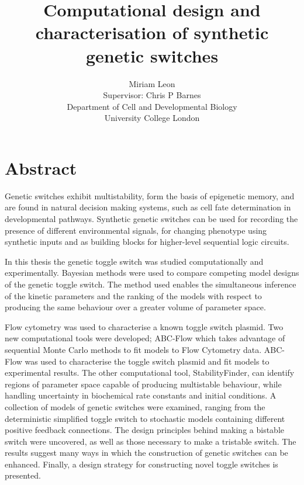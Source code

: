 \documentclass[]{phdthesis}
\begin{document}
\title{Computational design and\\characterisation of synthetic\\ genetic switches}
\author{Miriam Leon \\ Supervisor: Chris P Barnes\\ Department of Cell and Developmental
 Biology \\ University College London}
\date{}
\maketitle

\newpage
\section{Abstract}
Genetic switches exhibit multistability, form the basis of epigenetic memory, and are found in natural decision making systems, such as cell fate determination in developmental pathways. Synthetic genetic switches can be used for recording the presence of different environmental signals, for changing phenotype using synthetic inputs and as building blocks for higher-level sequential logic circuits. 

In this thesis the genetic toggle switch was studied computationally and experimentally. Bayesian methods were used to compare competing model designs of the genetic toggle switch. The method used enables the simultaneous inference of the kinetic parameters and the ranking of the models with respect to producing the same behaviour over a greater volume of parameter space.

Flow cytometry was used to characterise a known toggle switch plasmid. Two new computational tools were developed; ABC-Flow which takes advantage of sequential Monte Carlo methods to fit models to Flow Cytometry data. ABC-Flow was used to characterise the toggle switch plasmid and fit models to experimental results. The other computational tool, StabilityFinder, can identify regions of parameter space capable of producing multistable behaviour, while handling uncertainty in biochemical rate constants and initial conditions. A collection of models of genetic switches were examined, ranging from the deterministic simplified toggle switch to stochastic models containing different positive feedback connections. The design principles behind making a bistable switch were uncovered, as well as those necessary to make a tristable switch. The results suggest many ways in which the construction of genetic switches can be enhanced. Finally, a design strategy for constructing novel toggle switches is presented.
\newpage
\end{document}
